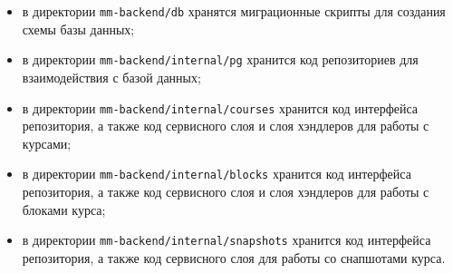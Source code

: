 \documentclass[coursework]{SCWorks}
\begin{document}
\begin{itemize}
  \item в директории \texttt{mm-backend/db} хранятся миграционные скрипты для создания схемы базы данных;
  \item в директории \texttt{mm-backend/internal/pg} хранится код репозиториев для взаимодействия с базой данных;
  \item в директории \texttt{mm-backend/internal/courses} хранится код интерфейса репозитория, а также код сервисного слоя и слоя хэндлеров для работы с курсами;
  \item в директории \texttt{mm-backend/internal/blocks} хранится код интерфейса репозитория, а также код сервисного слоя и слоя хэндлеров для работы с блоками курса;
  \item в директории \texttt{mm-backend/internal/snapshots} хранится код интерфейса репозитория, а также код сервисного слоя для работы со снапшотами курса.
\end{itemize}
\end{document}

